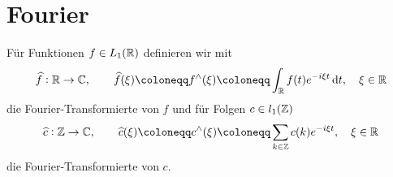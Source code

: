 \section{Fourier}

\begin{definition} \label{def:Fourier-Transformation}
Für Funktionen $ f \in L_{1}(\mathbb{R}) $ definieren wir mit
\[
  \widehat{f} : \R \rightarrow \C, \qquad
  \widehat{f}(\xi) \coloneqq f^{\wedge}(\xi) \coloneqq 
  \int_{\R} f(t) e^{-i\xi t} \dif t, \quad \xi \in \R
\]
die Fourier-Transformierte von $ f $ und für Folgen $ c \in l_{1}(\mathbb{Z}) $
\[
  \widehat{c} : \Z \rightarrow \C, \qquad
  \widehat{c}(\xi) \coloneqq c^{\wedge}(\xi) \coloneqq 
  \sum_{k \in \Z} c(k) e^{-i\xi t}, \quad \xi \in \R
\]
die Fourier-Transformierte von $ c $.
\end{definition}

